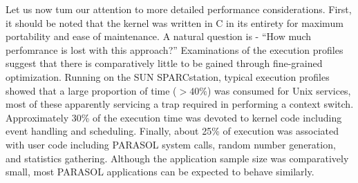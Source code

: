 \documentclass[11pt]{article}
\begin{document}
Let us now tum our attention to more detailed performance considerations. First, it should be noted
that the kernel was written in C in its entirety for maximum portability and ease of maintenance. A
natural question is - ``How much perfomrance is lost with this approach?'' Examinations of the
execution profiles suggest that there is comparatively little to be gained through fine-grained
optimization. Running on the SUN SPARCstation, typical execution profiles showed that a large
proportion of time ($> 40\%$) was consumed for Unix services, most of these apparently servicing a
trap required in performing a context switch. Approximately 30\% of the execution time was
devoted to kernel code including event handling and scheduling. Finally, about 25\% of execution
was associated with user code including PARASOL system calls, random number generation, and
statistics gathering. Although the application sample size was comparatively small, most
PARASOL applications can be expected to behave similarly.
\end{document}
